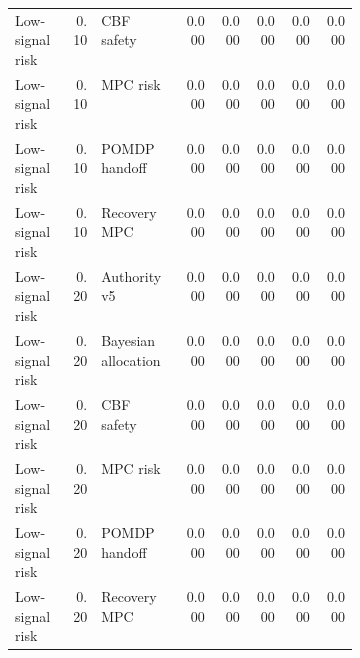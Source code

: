 \documentclass{article}
\begin{document}
\begin{center}
\begin{longtable}{p{0.16\linewidth}rp{0.24\linewidth}rrrrr}
Low-signal risk & 0.10 & CBF safety & 0.000 & 0.000 & 0.000 & 0.000 & 0.000\\
Low-signal risk & 0.10 & MPC risk & 0.000 & 0.000 & 0.000 & 0.000 & 0.000\\
Low-signal risk & 0.10 & POMDP handoff & 0.000 & 0.000 & 0.000 & 0.000 & 0.000\\
Low-signal risk & 0.10 & Recovery MPC & 0.000 & 0.000 & 0.000 & 0.000 & 0.000\\
Low-signal risk & 0.20 & Authority v5 & 0.000 & 0.000 & 0.000 & 0.000 & 0.000\\
Low-signal risk & 0.20 & Bayesian allocation & 0.000 & 0.000 & 0.000 & 0.000 & 0.000\\
Low-signal risk & 0.20 & CBF safety & 0.000 & 0.000 & 0.000 & 0.000 & 0.000\\
Low-signal risk & 0.20 & MPC risk & 0.000 & 0.000 & 0.000 & 0.000 & 0.000\\
Low-signal risk & 0.20 & POMDP handoff & 0.000 & 0.000 & 0.000 & 0.000 & 0.000\\
Low-signal risk & 0.20 & Recovery MPC & 0.000 & 0.000 & 0.000 & 0.000 & 0.000\\
\bottomrule
\end{longtable}
\normalsize
\end{center}
\end{document}
